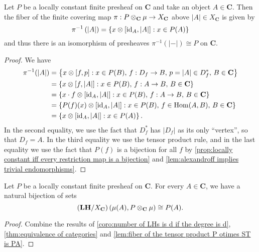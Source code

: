\begin{lemma}
\label{lem:fiber of the tensor product P otimes ST is PA}
Let $P$ be a locally constant finite presheaf on $\mathbf{C}$ and take an object $A \in \mathbf{C}$. Then the fiber of the finite covering map $\pi : P \otimes_\mathbf{C} \operatorname{\mu} \to X_{\mathbf{C}}$ above $|A| \in X_{\mathbf{C}}$ is given by
\[ \pi^{-1} \left( |A| \right) = \left\{ x \otimes [\operatorname{id}_A,|A|] : x \in P(A) \right\} \]
and thus there is an isomorphism of presheaves $\pi^{-1}(|-|) \cong P$ on $\mathbf{C}$.
\end{lemma}
\begin{proof}
We have
\begin{align*}
\pi^{-1}(|A|) &= \left\{ x \otimes [f,p]               : x \in P(B),\, f : D_f \to B,\, p = |A| \in D_f^*,\, B \in \mathbf{C} \right\} \\
              &= \left\{ x \otimes [f,|A|]             : x \in P(B),\, f : A   \to B,\, B \in \mathbf{C} \right\} \\
              &= \left\{ x \cdot f \otimes [\operatorname{id}_A,|A|] : x \in P(B),\, f : A \to B,\, B \in \mathbf{C} \right\} \\
              &= \left\{ P(f)(x) \otimes [\operatorname{id}_A, |A|]  : x \in P(B),\, f \in \operatorname{Hom}(A,B),\, B \in \mathbf{C} \right\} \\
              &= \left\{ x \otimes [\operatorname{id}_A, |A|]        : x \in P(A) \right\}.
\end{align*}
In the second equality, we use the fact that $D_f^*$ has $|D_f|$ as its only ``vertex'', so that $D_f = A$. In the third equality we use the tensor product rule, and in the last equality we use the fact that $P(f)$ is a bijection for all $f$ by \cref{prop:locally constant iff every restriction map is a bijection} and \cref{lem:alexandroff implies trivial endomorphisms}.
\end{proof}

\begin{corollary}
\label{coro:number of LHs if size of P(A) from ST(A) to the tensor product}
Let $P$ be a locally constant finite presheaf on $\mathbf{C}$. For every $A \in \mathbf{C}$, we have a natural bijection of sets
\[ \left(\mathbf{LH}/X_{\mathbf{C}}\right)\left(\operatorname{\mu}(A), P \otimes_{\mathbf{C}}\operatorname{\mu} \right) \cong P(A). \]
\end{corollary}
\begin{proof}
Combine the results of \cref{coro:number of LHs is d if the degree is d}, \cref{thm:equivalence of categories} and \cref{lem:fiber of the tensor product P otimes ST is PA}.
\end{proof}

